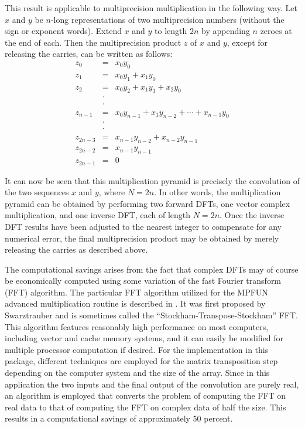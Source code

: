 This result is applicable to multiprecision multiplication in the
following way.  Let $x$ and $y$ be $n$-long representations of two
multiprecision numbers (without the sign or exponent words).  Extend
$x$ and $y$ to length $2n$ by appending $n$ zeroes at the end of each.
Then the multiprecision product $z$ of $x$ and $y$, except for
releasing the carries, can be written as follows:
\begin{eqnarray*}
z_0 &=& x_0 y_0 \\
z_1 &=& x_0 y_1 + x_1 y_0 \\
z_2 &=& x_0 y_2 + x_1 y_1 + x_2 y_0 \\
    &\cdot& \\
    &\cdot& \\
z_{n-1} &=& x_0 y_{n-1} + x_1 y_{n-2} + \cdots + x_{n-1} y_0 \\
    &\cdot& \\
    &\cdot& \\
z_{2n-3} &=& x_{n-1} y_{n-2} + x_{n-2} y_{n-1} \\
z_{2n-2} &=& x_{n-1} y_{n-1} \\
z_{2n-1} &=& 0
\end{eqnarray*}

It can now be seen that this multiplication pyramid is precisely the
convolution of the two sequences $x$ and $y$, where $N = 2n$.  In
other words, the multiplication pyramid can be obtained by performing
two forward DFTs, one vector complex multiplication, and one inverse
DFT, each of length $N = 2n$.  Once the inverse DFT results have been
adjusted to the nearest integer to compensate for any numerical error,
the final multiprecision product may be obtained by merely releasing
the carries as described above.

The computational savings arises from the fact that complex DFTs may
of course be economically computed using some variation of the fast
Fourier transform (FFT) algorithm.  The particular FFT algorithm
utilized for the MPFUN advanced multiplication routine is described in
\cite{dhb4}.  It was first proposed by Swarztrauber and is sometimes
called the ``Stockham-Transpose-Stockham'' FFT.  This algorithm
features reasonably high performance on most computers, including
vector and cache memory systems, and it can easily be modified for
multiple processor computation if desired.  For the implementation in
this package, different techniques are employed for the matrix
transposition step depending on the computer system and the size of
the array.  Since in this application the two inputs and the final
output of the convolution are purely real, an algorithm is employed
that converts the problem of computing the FFT on real data to that of
computing the FFT on complex data of half the size.  This results in a
computational savings of approximately 50 percent.

